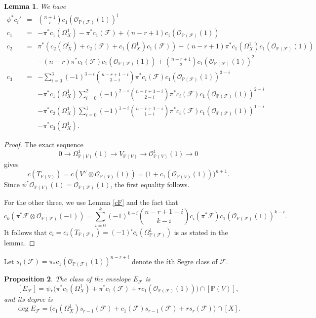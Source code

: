 \documentclass[reqno]{amsart}
\newtheorem{lemma}{Lemma}[section]
\newtheorem{prop}[lemma]{Proposition}
\theoremstyle{definition}
\theoremstyle{remark}
\begin{document}
\begin{lemma}\label{chern2}
We have
\begin{eqnarray*}
\psi^*c_i'&=&\binom{n+1}ic_1(\mathcal O_{\mathbb P(\mathcal F)}(1))^i\\
c_1&=&-\pi^*c_1(\Omega^1_X)-\pi^*c_1(\mathcal F)+(n-r+1)c_1(\mathcal O_{\mathbb P(\mathcal F)}(1))\\
c_2&=& \pi^*(c_2(\Omega^1_X)+c_2(\mathcal F)+c_1(\Omega^1_X)c_1(\mathcal F))
-(n-r+1)\pi^*c_1(\Omega^1_X)c_1(\mathcal O_{\mathbb P(\mathcal F)}(1))\\
&&-(n-r)\pi^*c_1(\mathcal F)c_1(\mathcal O_{\mathbb P(\mathcal F)}(1))
+\binom{n-r+1}2c_1(\mathcal O_{\mathbb P(\mathcal F)}(1))^2\\
c_3&=&-\sum_{i=0}^3(-1)^{3-i}\binom{n-r+1-i}{3-i}\pi^*c_i(\mathcal F)c_1(\mathcal O_{\mathbb P(\mathcal F)}(1))^{3-i} \\
&&-\pi^*c_1(\Omega_X^1)\sum_{i=0}^2(-1)^{2-i}\binom{n-r+1-i}{2-i}\pi^*c_i(\mathcal F)c_1(\mathcal O_{\mathbb P(\mathcal F)}(1))^{2-i} \\
&&-\pi^*c_2(\Omega_X^1)\sum_{i=0}^1(-1)^{1-i}\binom{n-r+1-i}{1-i}\pi^*c_i(\mathcal F)c_1(\mathcal O_{\mathbb P(\mathcal F)}(1))^{1-i} \\
&& -\pi^*c_3(\Omega_X^1).
\end{eqnarray*}
\end{lemma}

\begin{proof}
The exact sequence 
\[ 0\to \Omega_{\mathbb P(V)}^1(1) \to V_{\mathbb P(V)} \to \mathcal O_{\mathbb P(V)}^1(1) \to 0
\]
gives 
\[c(T_{\mathbb P(V)})=c(V^\vee\otimes \mathcal O_{\mathbb P(V)}(1)) =\bigl(1+c_1(\mathcal O_{\mathbb P(V)}(1))\bigr)^{n+1}.\]
Since $\psi^*\mathcal O_{\mathbb P(V)}(1)=\mathcal O_{\mathbb P(\mathcal F)}(1)$,
 the first equality follows. 

For the other three, we use Lemma \ref{cF} and the fact that
\[c_k(\pi^*\mathcal F\otimes \mathcal O_{\mathbb P(\mathcal F)}(-1))=\sum_{i=0}^k (-1)^{k-i} \binom{n-r+1-i}{k-i}c_i(\pi^*\mathcal F)c_1(\mathcal O_{\mathbb P(\mathcal F)}(1))^{k-i}.\] 
It follows that $c_i=c_i(T_{\mathbb P(\mathcal F)})=(-1)^ic_i(\Omega_{\mathbb P(\mathcal F)}^1)$ is as stated  in the lemma.
\end{proof}

Let  $s_{i}(\mathcal F)=\pi_*c_1(\mathcal O_{\mathbb P(\mathcal F)}(1))^{n-r+i}$ denote the $i$th Segre class of $\mathcal F$.

\begin{prop}\label{env}
The class of the envelope $E_\mathcal F$  is 
\[[E_\mathcal F]=\psi_*\bigl(\pi^* c_1(\Omega^1_X)+\pi^*c_1(\mathcal F)+rc_1(\mathcal O_{\mathbb P(\mathcal F)}(1))\bigr)\cap [\mathbb P(V)],\]
and its degree is
\[\deg E_\mathcal F=\bigl(c_1(\Omega_X^1)s_{r-1}(\mathcal F)+c_1(\mathcal F)s_{r-1}(\mathcal F)+rs_r(\mathcal F)\bigr)\cap [X].
\]
\end{prop}
\end{document}
